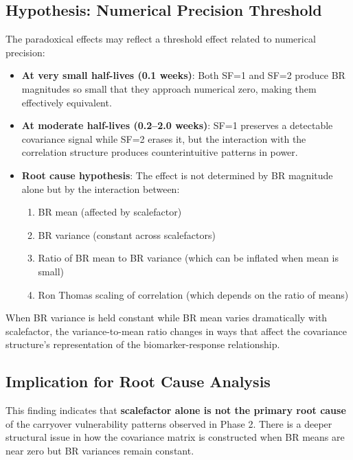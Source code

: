 \documentclass[12pt,a4paper]{article}
\begin{document}
\subsection{Hypothesis: Numerical Precision Threshold}

The paradoxical effects may reflect a threshold effect related to numerical precision:

\begin{itemize}
\item \textbf{At very small half-lives (0.1 weeks)}: Both SF=1 and SF=2 produce BR magnitudes so small that they approach numerical zero, making them effectively equivalent.

\item \textbf{At moderate half-lives (0.2--2.0 weeks)}: SF=1 preserves a detectable covariance signal while SF=2 erases it, but the interaction with the correlation structure produces counterintuitive patterns in power.

\item \textbf{Root cause hypothesis}: The effect is not determined by BR magnitude alone but by the interaction between:
  \begin{enumerate}
  \item BR mean (affected by scalefactor)
  \item BR variance (constant across scalefactors)
  \item Ratio of BR mean to BR variance (which can be inflated when mean is small)
  \item Ron Thomas scaling of correlation (which depends on the ratio of means)
  \end{enumerate}
\end{itemize}

When BR variance is held constant while BR mean varies dramatically with scalefactor, the variance-to-mean ratio changes in ways that affect the covariance structure's representation of the biomarker-response relationship.

\subsection{Implication for Root Cause Analysis}

This finding indicates that \textbf{scalefactor alone is not the primary root cause} of the carryover vulnerability patterns observed in Phase 2. There is a deeper structural issue in how the covariance matrix is constructed when BR means are near zero but BR variances remain constant.
\end{document}
